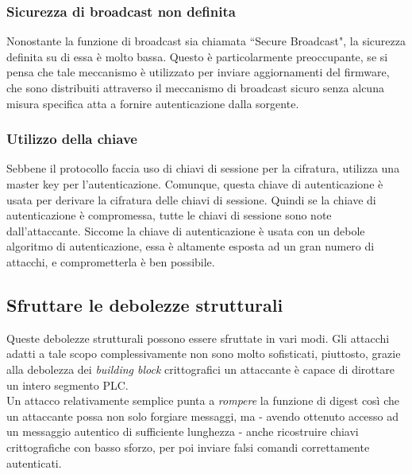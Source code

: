 \subsubsection{Sicurezza di broadcast non definita}
Nonostante la funzione di broadcast sia chiamata ``Secure Broadcast", la sicurezza definita su di essa è molto bassa. Questo è particolarmente preoccupante, se si pensa che tale meccanismo è utilizzato per inviare aggiornamenti del firmware, che sono distribuiti attraverso il meccanismo di broadcast sicuro senza alcuna misura specifica atta a fornire autenticazione dalla sorgente.
\subsubsection{Utilizzo della chiave}
Sebbene il protocollo faccia uso di chiavi di sessione per la cifratura, utilizza una master key per l'autenticazione. Comunque, questa chiave di autenticazione è usata per derivare la cifratura delle chiavi di sessione. Quindi se la chiave di autenticazione è compromessa, tutte le chiavi di sessione sono note dall'attaccante. Siccome la chiave di autenticazione è usata con un debole algoritmo di autenticazione, essa è altamente esposta ad un gran numero di attacchi, e comprometterla è ben possibile.
\subsection{Sfruttare le debolezze strutturali}
Queste debolezze strutturali possono essere sfruttate in vari modi. Gli attacchi adatti a tale scopo complessivamente non sono molto sofisticati, piuttosto, grazie alla debolezza dei \emph{building block} crittografici un attaccante è capace di dirottare un intero segmento PLC.\\
Un attacco relativamente semplice punta a \textit{rompere} la funzione di digest così che un attaccante possa non solo forgiare messaggi, ma - avendo ottenuto accesso ad un messaggio autentico di sufficiente lunghezza - anche ricostruire chiavi crittografiche con basso sforzo, per poi inviare falsi comandi correttamente autenticati.
